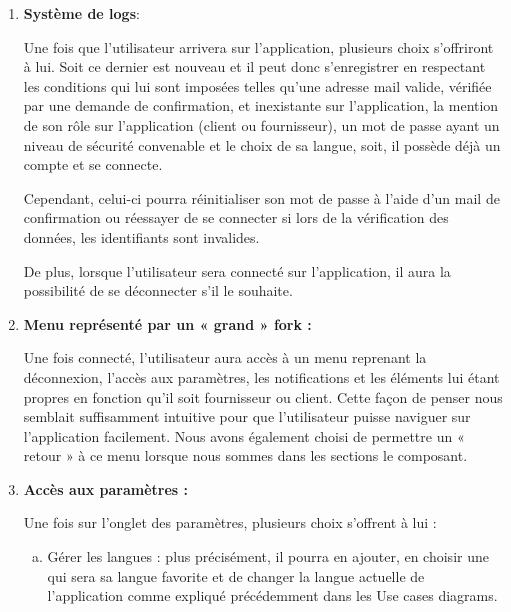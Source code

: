 \begin{enumerate}[1.]
\item  \textbf{Système de logs}:\newline 

Une fois que l’utilisateur arrivera sur l’application, plusieurs choix s’offriront à lui. Soit ce dernier est nouveau et il peut donc s’enregistrer en respectant les conditions qui lui sont imposées telles qu’une adresse mail valide, vérifiée par une demande de confirmation, et inexistante sur l’application, la mention de son rôle sur l’application (client ou fournisseur), un mot de passe ayant un niveau de sécurité convenable et le choix de sa langue, soit, il possède déjà un compte et se connecte. \newline

Cependant, celui-ci pourra réinitialiser son mot de passe à l’aide d’un mail de confirmation ou réessayer de se connecter si lors de la vérification des données, les identifiants sont invalides.\newline

De plus, lorsque l’utilisateur sera connecté sur l’application, il aura la possibilité de se déconnecter s’il le souhaite.

\item \textbf{Menu représenté par un « grand » fork :}\newline

Une fois connecté, l’utilisateur aura accès à un menu reprenant la déconnexion, l’accès aux paramètres, les notifications et les éléments lui étant propres en fonction qu’il soit fournisseur ou client. \newline
Cette façon de penser nous semblait suffisamment intuitive pour que l’utilisateur puisse naviguer sur l’application facilement. 
Nous avons également choisi de permettre un « retour » à ce menu lorsque nous sommes dans les sections le composant.

\item \textbf{Accès aux paramètres :}\newline

Une fois sur l’onglet des paramètres, plusieurs choix s’offrent à lui : 

\begin{enumerate}[a)]

\item Gérer les langues : plus précisément, il pourra en ajouter, en choisir une qui sera sa langue favorite et de changer la langue actuelle de l'application comme expliqué précédemment dans les Use cases diagrams.


\end{enumerate}
\end{enumerate}
